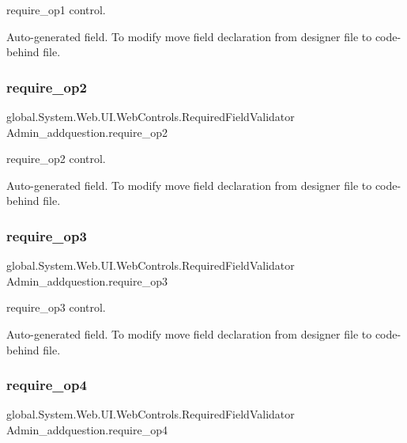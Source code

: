 require\+\_\+op1 control. 

Auto-\/generated field. To modify move field declaration from designer file to code-\/behind file. \mbox{\label{class_admin__addquestion_a3b8fcb44eba610c695289b5d38eac586}} 
\subsubsection{\texorpdfstring{require\_op2}{require\_op2}}
{\footnotesize\ttfamily global.\+System.\+Web.\+U\+I.\+Web\+Controls.\+Required\+Field\+Validator Admin\+\_\+addquestion.\+require\+\_\+op2\hspace{0.3cm}{\ttfamily [protected]}}



require\+\_\+op2 control. 

Auto-\/generated field. To modify move field declaration from designer file to code-\/behind file. \mbox{\label{class_admin__addquestion_ac829cee27f2d3e22dac9b1a4e4598fb3}} 
\subsubsection{\texorpdfstring{require\_op3}{require\_op3}}
{\footnotesize\ttfamily global.\+System.\+Web.\+U\+I.\+Web\+Controls.\+Required\+Field\+Validator Admin\+\_\+addquestion.\+require\+\_\+op3\hspace{0.3cm}{\ttfamily [protected]}}



require\+\_\+op3 control. 

Auto-\/generated field. To modify move field declaration from designer file to code-\/behind file. \mbox{\label{class_admin__addquestion_a672678540345fb6f5632b897083a2c27}} 
\subsubsection{\texorpdfstring{require\_op4}{require\_op4}}
{\footnotesize\ttfamily global.\+System.\+Web.\+U\+I.\+Web\+Controls.\+Required\+Field\+Validator Admin\+\_\+addquestion.\+require\+\_\+op4\hspace{0.3cm}{\ttfamily [protected]}}



